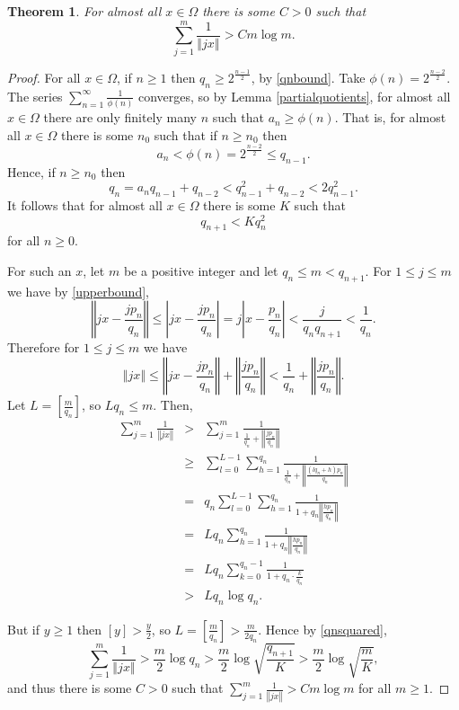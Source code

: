 \documentclass{amsart}
\newcommand{\norm}[1]{\left\Vert #1 \right\Vert}
\newtheorem{theorem}{Theorem}
\begin{document}
\begin{theorem}
For almost all $x \in \Omega$ there is some $C>0$ such that
\[
\sum_{j=1}^m \frac{1}{\norm{jx}} > C m \log m.
\]
\label{omegabound}
\end{theorem}
\begin{proof}
For all $x \in \Omega$, if $n \geq 1$ then $q_n \geq 2^{\frac{n-1}{2}}$, by \eqref{qnbound}. Take $\phi(n)=2^{\frac{n-2}{2}}$. The series $\sum_{n=1}^\infty \frac{1}{\phi(n)}$ converges, so by Lemma \ref{partialquotients}, for almost all $x \in \Omega$ there are only finitely many $n$ such that  $a_n \geq \phi(n)$. That is, for almost all $x \in \Omega$ there is some $n_0$ such that if $n \geq n_0$ then
\[
a_n<\phi(n) =2^{\frac{n-2}{2}} \leq q_{n-1}.
\]
Hence, if $n \geq n_0$ then
\[
q_n = a_n q_{n-1}+q_{n-2} < q_{n-1}^2+q_{n-2}< 2 q_{n-1}^2.
\]
It follows that for almost all $x \in \Omega$ there is some $K$ such that
\begin{equation}
q_{n+1} < K q_n^2
\label{qnsquared}
\end{equation}
for all $n \geq 0$.

For such an $x$, let $m$ be a positive integer and let $q_n \leq m < q_{n+1}$. For $1 \leq j \leq m$ we have by \eqref{upperbound},
\[
\norm{jx-\frac{jp_n}{q_n}} \leq \left| jx-\frac{jp_n}{q_n} \right|=j  \left| x-\frac{p_n}{q_n} \right| < \frac{j}{q_n q_{n+1}}
< \frac{1}{q_n}.
\]
Therefore for $1 \leq j \leq m$ we have
\[
\norm{jx} \leq \norm{jx-\frac{jp_n}{q_n}}+ \norm{\frac{jp_n}{q_n}}<\frac{1}{q_n}+\norm{\frac{jp_n}{q_n}}.
\]
Let $L=[ \frac{m}{q_n} ]$, so $Lq_n \leq m$. Then,
\begin{eqnarray*}
\sum_{j=1}^m \frac{1}{\norm{jx}}&>&\sum_{j=1}^m \frac{1}{\frac{1}{q_n}+\norm{\frac{jp_n}{q_n}}}\\
&\geq&\sum_{l=0}^{L-1} \sum_{h=1}^{q_n} \frac{1}{\frac{1}{q_n}+\norm{\frac{(lq_n+h)p_n}{q_n}}}\\
&=&q_n \sum_{l=0}^{L-1} \sum_{h=1}^{q_n} \frac{1}{1+q_n\norm{\frac{hp_n}{q_n}}}\\
&=&Lq_n  \sum_{h=1}^{q_n} \frac{1}{1+q_n\norm{\frac{hp_n}{q_n}}}\\
&=&Lq_n \sum_{k=0}^{q_n-1} \frac{1}{1+q_n\cdot \frac{k}{q_n}}\\
&>&Lq_n \log q_n.
\end{eqnarray*}

But if $y\geq 1$ then $[ y ] > \frac{y}{2}$, so $L=[ \frac{m}{q_n} ] > \frac{m}{2q_n}$. Hence by \eqref{qnsquared},
\[
\sum_{j=1}^m \frac{1}{\norm{jx}} > \frac{m}{2} \log q_n > \frac{m}{2} \log \sqrt{\frac{q_{n+1}}{K}} > 
\frac{m}{2} \log \sqrt{\frac{m}{K}},
\]
and thus there is some $C>0$ such that $\sum_{j=1}^m \frac{1}{\norm{jx}} > C m \log m$ for all $m \geq 1$.
\end{proof}
\end{document}
